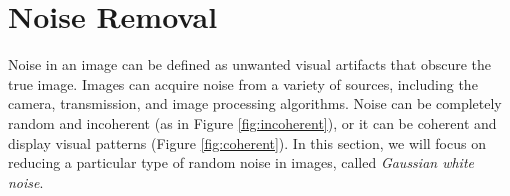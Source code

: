 %
%

\section*{Noise Removal}
Noise in an image can be defined as unwanted visual artifacts that
obscure the true image. Images can acquire noise from a variety of
sources, including the camera, transmission, and image processing
algorithms. Noise can be completely random and incoherent (as in
Figure \ref{fig:incoherent}), or it can be coherent and display
visual patterns (Figure \ref{fig:coherent}). In this section, we will
focus on reducing a particular type of random noise in images, called
\textit{Gaussian white noise}.

